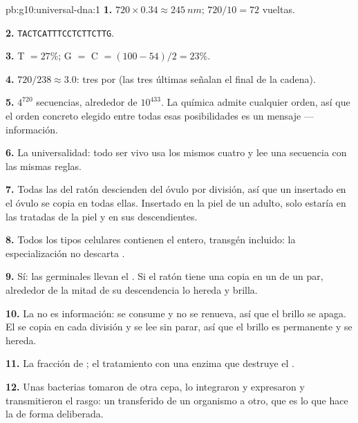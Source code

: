 \begin{solution}{pb:g10:universal-dna:1}
\textbf{1.} $720 \times 0.34 \approx \qty{245}{nm}$; $720/10 = 72$
vueltas.

\textbf{2.} \texttt{TACTCATTTCCTCTTCTTG}.

\textbf{3.} T $= 27\%$; G $=$ C $= (100 - 54)/2 = 23\%$.

\textbf{4.} $720/238 \approx 3.0$: tres  por  (las tres
últimas señalan el final de la cadena).

\textbf{5.} $4^{720}$ secuencias, alrededor de $10^{433}$. La química
admite cualquier orden, así que el orden concreto elegido entre todas
esas posibilidades es un mensaje --- información.

\textbf{6.} La universalidad: todo ser vivo usa los mismos cuatro
 y lee una secuencia con las mismas reglas.

\textbf{7.} Todas las  del ratón descienden del óvulo por
división, así que un  insertado en el óvulo se copia en todas ellas.
Insertado en la piel de un adulto, solo estaría en las  tratadas
de la piel y en sus descendientes.

\textbf{8.} Todos los tipos celulares contienen el  entero,
transgén incluido: la especialización no descarta .

\textbf{9.} Sí: las  germinales llevan el . Si el ratón tiene
una copia en un  de un par, alrededor de la mitad de su
descendencia lo hereda y brilla.

\textbf{10.} La  no es información: se consume y no se renueva,
así que el brillo se apaga. El  se copia en cada división y se lee
sin parar, así que el brillo es permanente y se hereda.

\textbf{11.} La fracción de ; el tratamiento con una enzima que
destruye el .

\textbf{12.} Unas bacterias tomaron  de otra cepa, lo integraron y
expresaron y transmitieron el rasgo: un  transferido de un organismo
a otro, que es lo que hace la  de forma deliberada.


\end{solution}
